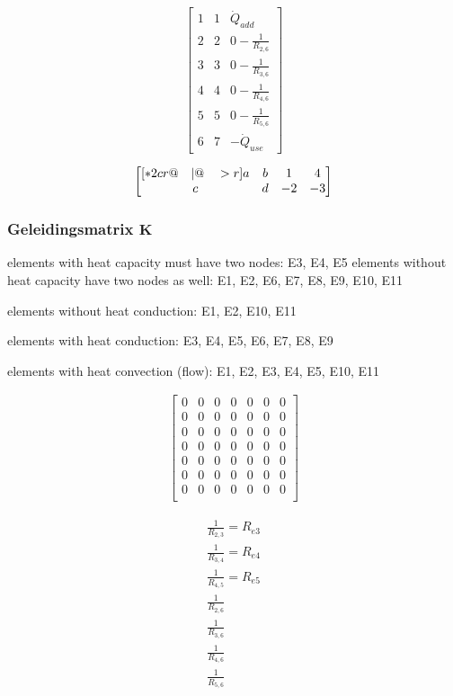 \[
\begin{bmatrix}
	1 & 1 & \dot{Q}_{add}\\
	2 & 2 & 0 - \frac{1}{R_{2,6}}\\
	3 & 3 & 0 - \frac{1}{R_{3,6}}\\
	4 & 4 & 0 - \frac{1}{R_{4,6}}\\
	5 & 5 & 0 - \frac{1}{R_{5,6}}\\
	6 & 7 & -\dot{Q}_{use}
\end{bmatrix}
\]

\[
\begin{bmatrix}[*2cr@{\quad}|@{\quad}>{\bf\color{red}}r]
	a & b & 1  &  4 \\
	c & d & -2 & -3
\end{bmatrix}
\]

\subsubsection{Geleidingsmatrix $\mathbf{K}$}

elements with heat capacity must have two nodes:
E3, E4, E5
elements without heat capacity have two nodes as well:
E1, E2, E6, E7, E8, E9, E10, E11

elements without heat conduction:
E1, E2, E10, E11

elements with heat conduction:
E3, E4, E5, E6, E7, E8, E9

elements with heat convection (flow):
E1, E2, E3, E4, E5, E10, E11

\begin{equation}
	\begin{aligned}
		\begin{bmatrix}
			0 & 0 & 0 & 0 & 0 & 0 & 0\\
			0 & 0 & 0 & 0 & 0 & 0 & 0\\
			0 & 0 & 0 & 0 & 0 & 0 & 0\\
			0 & 0 & 0 & 0 & 0 & 0 & 0\\
			0 & 0 & 0 & 0 & 0 & 0 & 0\\
			0 & 0 & 0 & 0 & 0 & 0 & 0\\
			0 & 0 & 0 & 0 & 0 & 0 & 0\\
		\end{bmatrix}
	\end{aligned}
\end{equation}

\begin{equation}
	\begin{aligned}
\frac{1}{R_{2,3}} = R_{e3} \\
\frac{1}{R_{3,4}} = R_{e4} \\
\frac{1}{R_{4,5}} = R_{e5} \\
\frac{1}{R_{2,6}} \\
\frac{1}{R_{3,6}} \\
\frac{1}{R_{4,6}} \\
\frac{1}{R_{5,6}} 
	\end{aligned}
\end{equation}

